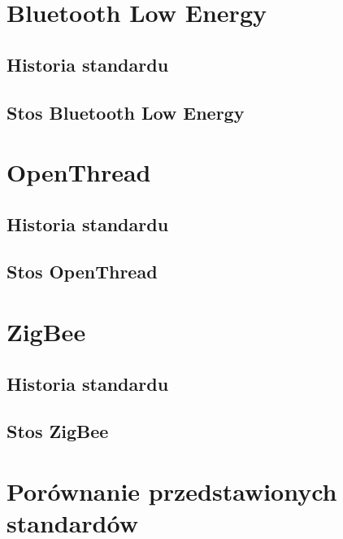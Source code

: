 \section{Bluetooth Low Energy}
\subsection{Historia standardu}
\subsection{Stos Bluetooth Low Energy}

\section{OpenThread}
\subsection{Historia standardu}
\subsection{Stos OpenThread}

\section{ZigBee}
\subsection{Historia standardu}
\subsection{Stos ZigBee}

\section{Porównanie przedstawionych standardów}


